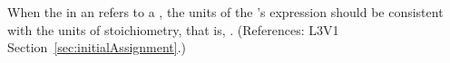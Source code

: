 When the  in an \InitialAssignment refers to a \SpeciesReference,
the units of the \InitialAssignment's  expression should be
consistent with the units of stoichiometry,
that is, .  (References: 
L3V1 Section~\ref{sec:initialAssignment}.)
